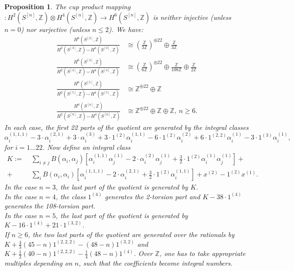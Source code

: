 \documentclass{amsart}
\newcommand{\hilb}[1]{^{[#1]}}
\newcommand{\One}{1}
\newcommand{\IZ}{\mathbb{Z}}
\theoremstyle{plain}
\newtheorem{proposition}[theorem]{Proposition}
\theoremstyle{definition}
\theoremstyle{remark}
\begin{document}
\begin{proposition} \label{p24}The cup product mapping $ : H^2(S\hilb{n},\IZ)\otimes H^4(S\hilb{n},\IZ) \rightarrow H^6(S\hilb{n},\IZ) $ is neither injective (unless $n=0$) nor surjective (unless $n\leq 2$). We have:
\begin{align} 
\frac{H^6(S\hilb{3},\IZ)}{H^2(S\hilb{3},\IZ)\smile H^4(S\hilb{3},\IZ)} &\cong \left(\frac{\IZ}{3\IZ}\right)^{\oplus 22} \oplus \frac{\IZ}{3\IZ}
\\
\frac{H^6(S\hilb{4},\IZ)}{H^2(S\hilb{4},\IZ)\smile H^4(S\hilb{4},\IZ)} &\cong  \left(\frac{\IZ}{6\IZ}\right)^{\oplus 22}\oplus\frac{\IZ}{108\IZ} \oplus\frac{\IZ}{2\IZ} 
\\
\frac{H^6(S\hilb{5},\IZ)}{H^2(S\hilb{5},\IZ)\smile H^4(S\hilb{5},\IZ)} &\cong 
 \IZ^{\oplus 22} \oplus \IZ
\\
\frac{H^6(S\hilb{n},\IZ)}{H^2(S\hilb{n},\IZ)\smile H^4(S\hilb{n},\IZ)} &\cong 
 \IZ^{\oplus 22} \oplus \IZ\oplus\IZ, \ n\geq 6.
\end{align}
In each case, the first 22 parts of the quotient are generated by the integral classes 
 $$
\alpha_i^{(1,1,1)} -3\cdot \alpha_i^{(2,1)} + 3\cdot \alpha_i^{(3)}+ 3 \cdot \One^{(2)}\alpha_i^{(1,1)} -6\cdot \One^{(2)}\alpha_i^{(2)}+6\cdot \One^{(2,2)}\alpha_i^{(1)}-3\cdot \One^{(3)}\alpha_i^{(1)},
$$ 
for $ i=1\ldots 22$. Now define an integral class
\begin{align*}
K:=&\;\sum_{i\neq j} B(\alpha_i,\alpha_j)\left[\alpha_i^{(1,1)}\alpha_j^{(1)} - 2\cdot\alpha_i^{(2)}\alpha_j^{(1)}+\frac{3}{2}\cdot \One^{(2)}\alpha_i^{(1)}\alpha_j^{(1)} \right] +\\
+&\;\sum_{i}B(\alpha_i,\alpha_i)\left[\alpha_i^{(1,1,1)} - 2\cdot\alpha_i^{(2,1)} + \frac{3}{2}\cdot \One^{(2)}\alpha_i^{(1,1)} \right]+  x^{(2)}-\One^{(2)}x^{(1)}.
\end{align*} 
In the case $n=3$, the last part of the quotient is generated by $K$. 
\\In the case $n=4$, the class $ \One^{(4)}$ generates the 2-torsion part and $K-38\cdot\One^{(4)}$ generates the 108-torsion part.
\\In the case $n=5$, the last part of the quotient is generated by $K - 16\cdot \One^{(4)} + 21\cdot \One^{(3,2)}$.\\
If $n\geq 6$, the two last parts of the quotient are generated over the rationals by $K +\frac{4}{3}(45-n)\One^{(2,2,2)} - (48-n)\One^{(3,2)}$ and $K+\frac{1}{2}(40-n)\One^{(2,2,2)}- \frac{1}{4}(48-n)\One^{(4)}$. Over $\IZ$, one has to take appropriate multiples depending on $n$, such that the coefficients become integral numbers.
\end{proposition}
\end{document}
